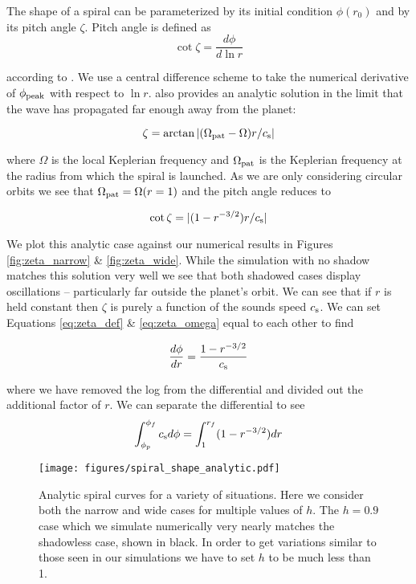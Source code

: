 \documentclass[twocolumn]{aastex631}
\begin{document}
The shape of a spiral can be parameterized by its initial condition $\phi(r_0)$ and by its pitch angle $\zeta$. Pitch angle
is defined as
\begin{equation}
    \cot \zeta = \frac{d\phi}{d \ln r}
    \label{zeta_def}
\end{equation}

according to \citet{zhu2022}. We use a central difference scheme to take the numerical derivative of $\phi_{\rm peak}$ with respect to $\ln r$.
\citet{zhu2022} also provides an analytic solution in the limit that the wave has propagated far enough away from the planet:

\begin{equation}
    \zeta = \arctan |(\Omega_{\rm pat} - \Omega)r/c_{\rm s}|
\end{equation}

where $\Omega$ is the local Keplerian frequency and $\Omega_{\rm pat}$ is the Keplerian frequency at the
radius from which the spiral is launched. As we are only considering circular orbits we see that 
$\Omega_{\rm pat} = \Omega(r=1)$ and the pitch angle reduces to

\begin{equation}
    \cot \zeta = |(1-r^{-3/2}) r/c_{\rm s}|
    \label{eq:zeta_omega}
\end{equation}

We plot this analytic case against our numerical results in Figures \ref{fig:zeta_narrow} \& \ref{fig:zeta_wide}. While the simulation with
no shadow matches this solution very well we see that both shadowed cases display oscillations -- particularly far outside the planet's orbit.
We can see that if $r$ is held constant then $\zeta$ is purely a function of the sounds speed $c_{\rm s}$. We can set
Equations \ref{eq:zeta_def} \& \ref{eq:zeta_omega} equal to each other to find

\begin{equation}
    \frac{d\phi}{d r} = \frac{1-r^{-3/2}}{c_{\rm s}}
\end{equation}

where we have removed the log from the differential and divided out the additional factor of $r$. We can separate the differential to see
\begin{equation}
    \int_{\phi_p}^{\phi_f} c_{\rm s} d \phi = \int_{1}^{r_f} (1-r^{-3/2}) d r
    \label{eq:analytic_shadow}
\end{equation}

\begin{figure}
    \centering
    \texttt{[image: figures/spiral\_shape\_analytic.pdf]}
    \caption{
        Analytic spiral curves for a variety of situations. Here we consider both the narrow and wide cases for multiple values of $h$.
        The $h=0.9$ case which we simulate numerically very nearly matches the shadowless case, shown in black. In order to get
        variations similar to those seen in our simulations we have to set $h$ to be much less than 1.
    }
    \label{fig:analytic_spiral}
\end{figure}
\end{document}
